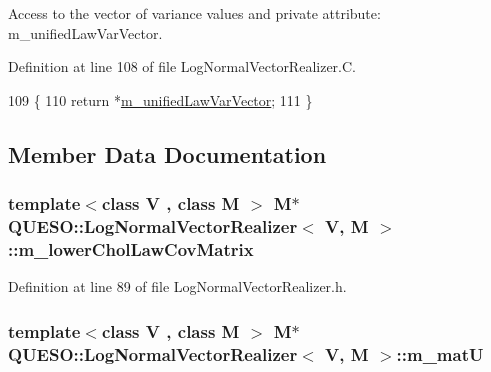 Access to the vector of variance values and private attribute\-: m\-\_\-unified\-Law\-Var\-Vector. 



Definition at line 108 of file Log\-Normal\-Vector\-Realizer.\-C.


\begin{DoxyCode}
109 \{
110   \textcolor{keywordflow}{return} *\hyperlink{class_q_u_e_s_o_1_1_log_normal_vector_realizer_a418dbfe867eb80b53ebe3aeaf26d208c}{m\_unifiedLawVarVector};
111 \}
\end{DoxyCode}


\subsection{Member Data Documentation}
\hypertarget{class_q_u_e_s_o_1_1_log_normal_vector_realizer_a9a0d52cb94a3de5aa367d4e66f4fa137}{
\subsubsection[{m\-\_\-lower\-Chol\-Law\-Cov\-Matrix}]{\setlength{\rightskip}{0pt plus 5cm}template$<$class V , class M $>$ M$\ast$ {\bf Q\-U\-E\-S\-O\-::\-Log\-Normal\-Vector\-Realizer}$<$ V, M $>$\-::m\-\_\-lower\-Chol\-Law\-Cov\-Matrix\hspace{0.3cm}{\ttfamily [private]}}}\label{class_q_u_e_s_o_1_1_log_normal_vector_realizer_a9a0d52cb94a3de5aa367d4e66f4fa137}


Definition at line 89 of file Log\-Normal\-Vector\-Realizer.\-h.

\hypertarget{class_q_u_e_s_o_1_1_log_normal_vector_realizer_ac5d5aae6606895a42ab1c899bdb37906}{
\subsubsection[{m\-\_\-mat\-U}]{\setlength{\rightskip}{0pt plus 5cm}template$<$class V , class M $>$ M$\ast$ {\bf Q\-U\-E\-S\-O\-::\-Log\-Normal\-Vector\-Realizer}$<$ V, M $>$\-::m\-\_\-mat\-U\hspace{0.3cm}{\ttfamily [private]}}}\label{class_q_u_e_s_o_1_1_log_normal_vector_realizer_ac5d5aae6606895a42ab1c899bdb37906}


